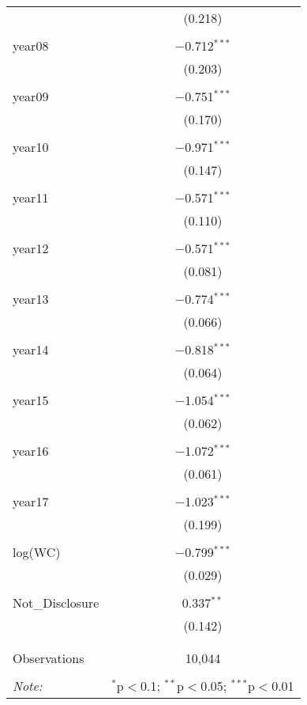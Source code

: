 \documentclass{article}
\begin{document}
\begin{table}[!htbp]
\begin{tabular}{@{\extracolsep{5pt}}lc}
		& (0.218) \\ 
		& \\ 
		year08 & $-$0.712$^{***}$ \\ 
		& (0.203) \\ 
		& \\ 
		year09 & $-$0.751$^{***}$ \\ 
		& (0.170) \\ 
		& \\ 
		year10 & $-$0.971$^{***}$ \\ 
		& (0.147) \\ 
		& \\ 
		year11 & $-$0.571$^{***}$ \\ 
		& (0.110) \\ 
		& \\ 
		year12 & $-$0.571$^{***}$ \\ 
		& (0.081) \\ 
		& \\ 
		year13 & $-$0.774$^{***}$ \\ 
		& (0.066) \\ 
		& \\ 
		year14 & $-$0.818$^{***}$ \\ 
		& (0.064) \\ 
		& \\ 
		year15 & $-$1.054$^{***}$ \\ 
		& (0.062) \\ 
		& \\ 
		year16 & $-$1.072$^{***}$ \\ 
		& (0.061) \\ 
		& \\ 
		year17 & $-$1.023$^{***}$ \\ 
		& (0.199) \\ 
		& \\ 
		log(WC) & $-$0.799$^{***}$ \\ 
		& (0.029) \\ 
		& \\ 
		Not\_Disclosure & 0.337$^{**}$ \\ 
		& (0.142) \\ 
		& \\ 
		\hline \\[-1.8ex] 
		Observations & 10,044 \\ 
		\hline 
		\hline \\[-1.8ex] 
		\textit{Note:}  & \multicolumn{1}{r}{$^{*}$p$<$0.1; $^{**}$p$<$0.05; $^{***}$p$<$0.01} \\ 
	\end{tabular} 
\end{table}  
\end{document}
